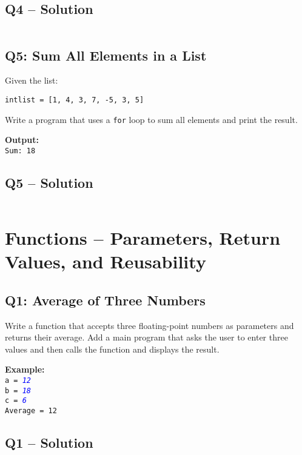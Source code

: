 \documentclass[a4paper,11pt]{article}
\begin{document}
		
	\subsection*{Q4 – Solution}
	\inputminted{python}{Files/3/4.py}
	
	\subsection*{Q5: Sum All Elements in a List}
	Given the list:
	
	\texttt{intlist = [1, 4, 3, 7, -5, 3, 5]}
	
	Write a program that uses a \texttt{for} loop to sum all elements and print the result.
	
	\textbf{Output:}\\
	\texttt{Sum: 18}
	

	
	\subsection*{Q5 – Solution}
	\inputminted{python}{Files/3/5.py}
	
		
	


\section{Functions – Parameters, Return Values, and Reusability}

\subsection*{Q1: Average of Three Numbers}
Write a function that accepts three floating-point numbers as parameters and returns their average. Add a main program that asks the user to enter three values and then calls the function and displays the result.

\textbf{Example:}\\
\texttt{a = \textcolor{blue}{\textit{12}}}\\
\texttt{b = \textcolor{blue}{\textit{18}}}\\
\texttt{c = \textcolor{blue}{\textit{6}}}\\
\texttt{Average = 12}

\subsection*{Q1 – Solution}
\inputminted{python}{Files/4/1.py}
\end{document}
